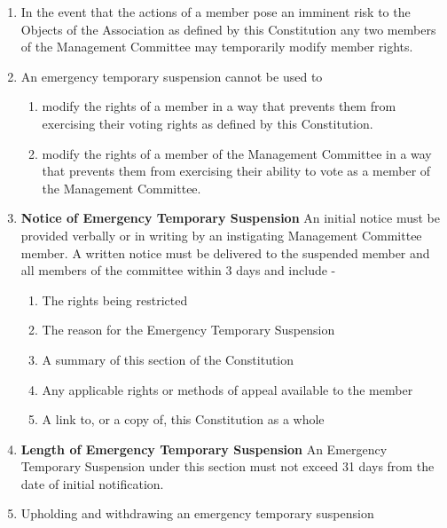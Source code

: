 \documentclass[../constitution.tex]{subfiles}
\begin{document}
\begin{enumerate}

\item In the event that the actions of a member pose an imminent risk to the Objects of the Association as defined by this Constitution any two members of the Management Committee may temporarily modify member rights.
\item An emergency temporary suspension cannot be used to

  \begin{enumerate}
  
  \item modify the rights of a member in a way that prevents them from exercising their voting rights as defined by this Constitution.
  \item modify the rights of a member of the Management Committee in a way that prevents them from exercising their ability to vote as a member of the Management Committee.
  \end{enumerate}
\item \textbf{Notice of Emergency Temporary Suspension} An initial notice must be provided verbally or in writing by an instigating Management Committee member. A written notice must be delivered to the suspended member and all members of the committee within 3 days and include -

  \begin{enumerate}
  
  \item The rights being restricted\\
  \item The reason for the Emergency Temporary Suspension\\
  \item A summary of this section of the Constitution\\
  \item Any applicable rights or methods of appeal available to the member
  \item A link to, or a copy of, this Constitution as a whole\\
  \end{enumerate}
\item \textbf{Length of Emergency Temporary Suspension} An Emergency Temporary Suspension under this section must not exceed 31 days from the date of initial notification.\\
\item Upholding and withdrawing an emergency temporary suspension


\end{enumerate}
\end{document}
